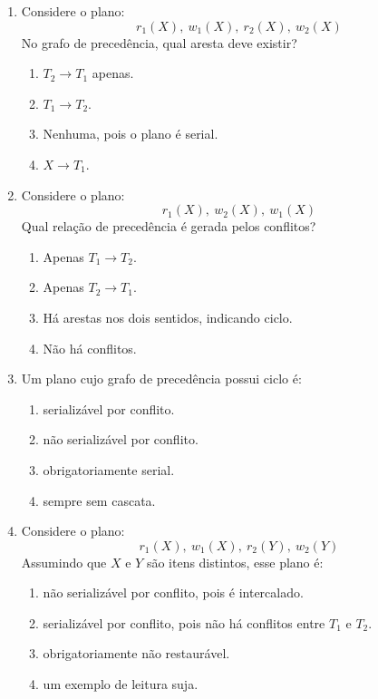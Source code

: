 \documentclass[12pt,a4paper]{article}
\begin{document}
\begin{enumerate}[resume,label=\textbf{Q\arabic*.}]
\item Considere o plano:
\[
r_1(X),\ w_1(X),\ r_2(X),\ w_2(X)
\]
No grafo de precedência, qual aresta deve existir?

\begin{enumerate}[label=\alph*)]
    \item $T_2 \rightarrow T_1$ apenas.
    \item $T_1 \rightarrow T_2$.
    \item Nenhuma, pois o plano é serial.
    \item $X \rightarrow T_1$.
\end{enumerate}

\item Considere o plano:
\[
r_1(X),\ w_2(X),\ w_1(X)
\]
Qual relação de precedência é gerada pelos conflitos?

\begin{enumerate}[label=\alph*)]
    \item Apenas $T_1 \rightarrow T_2$.
    \item Apenas $T_2 \rightarrow T_1$.
    \item Há arestas nos dois sentidos, indicando ciclo.
    \item Não há conflitos.
\end{enumerate}

\item Um plano cujo grafo de precedência possui ciclo é:

\begin{enumerate}[label=\alph*)]
    \item serializável por conflito.
    \item não serializável por conflito.
    \item obrigatoriamente serial.
    \item sempre sem cascata.
\end{enumerate}

\item Considere o plano:
\[
r_1(X),\ w_1(X),\ r_2(Y),\ w_2(Y)
\]
Assumindo que $X$ e $Y$ são itens distintos, esse plano é:

\begin{enumerate}[label=\alph*)]
    \item não serializável por conflito, pois é intercalado.
    \item serializável por conflito, pois não há conflitos entre $T_1$ e $T_2$.
    \item obrigatoriamente não restaurável.
    \item um exemplo de leitura suja.
\end{enumerate}


\end{enumerate}
\end{document}

